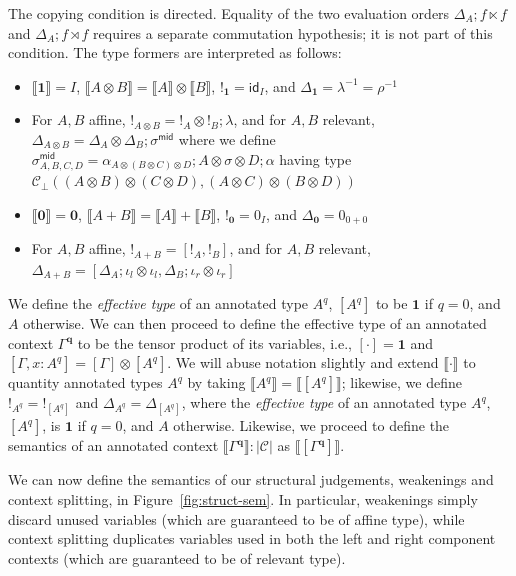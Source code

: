 \documentclass[acmsmall,screen,anonymous,review]{acmart}
\newcommand{\mc}[1]{\ensuremath{\mathcal{#1}}}
\newcommand{\mb}[1]{\ensuremath{\mathbf{#1}}}
\newcommand{\ms}[1]{\ensuremath{\mathsf{#1}}}
\newcommand{\etoty}[1]{[#1]}
\newcommand{\dnt}[1]{\llbracket{#1}\rrbracket}
\newcommand{\tmor}[1]{{!}_{#1}}
\newcommand{\dmor}[1]{{\Delta}_{#1}}
\newcommand{\subiterexp}{\texorpdfstring{\(\lambda_{\ms{iter}}\)}{lambda-iter}}
\begin{document}
\begin{definition}[\subiterexp-model]
  The copying condition is directed. Equality of the two evaluation orders
  $\dmor{A} ; f \ltimes f$ and $\dmor{A} ; f \rtimes f$ requires a separate
  commutation hypothesis; it is not part of this condition.
  The type formers are interpreted as follows:
  \begin{itemize}
    \item $\dnt{\mb{1}} = I$, $\dnt{A \otimes B} = \dnt{A} \otimes \dnt{B}$, 
          $\tmor{\mb{1}} = \ms{id}_I$, and $\dmor{\mb{1}} = \lambda^{-1} = \rho^{-1}$
    \item For $A, B$ affine, $\tmor{A \otimes B} = \tmor{A} \otimes \tmor{B} ; \lambda$, and for $A,
    B$ relevant, $\dmor{A \otimes B} = \dmor{A} \otimes \dmor{B} ; \sigma^{\ms{mid}}
    $
    where we define
    $
    \sigma^{\ms{mid}}_{A, B, C, D} = 
      \alpha_{A \otimes (B \otimes C) \otimes D}
      ; A \otimes \sigma \otimes D
      ; \alpha
    $
    having type $\mc{C}_\bot(
        (A \otimes B) \otimes (C \otimes D), 
        (A \otimes C) \otimes (B \otimes D)
      )
    $
    \item $\dnt{\mb{0}} = \mb{0}$, $\dnt{A + B} = \dnt{A} + \dnt{B}$, 
          $\tmor{\mb{0}} = 0_{I}$, and $\dmor{\mb{0}} = 0_{0 + 0}$
    \item For $A, B$ affine, $\tmor{A + B} = [\tmor{A}, \tmor{B}]$, and for $A, B$ relevant,
    $\dmor{A + B} = [\dmor{A} ; \iota_l \otimes \iota_l, \dmor{B} ; \iota_r \otimes \iota_r]
    $
  \end{itemize}
\end{definition}
We define the \emph{effective type} of an annotated type $A^q$, $\etoty{A^q}$ to be $\mb{1}$ if
$q = 0$, and $A$ otherwise. We can then proceed to define the effective type of an annotated context
$\Gamma^{\mb{q}}$ to be the tensor product of its variables, i.e., $\etoty{\cdot} = \mb{1}$ and
$\etoty{\Gamma, x : A^q} = \etoty{\Gamma} \otimes \etoty{A^q}$. We will abuse notation slightly and
extend $\dnt{\cdot}$ to quantity annotated types $A^q$ by taking $\dnt{A^q} = \dnt{\etoty{A^q}}$;
likewise, we define $\tmor{A^q} = \tmor{\etoty{A^q}}$ and $\dmor{A^q} = \dmor{\etoty{A^q}}$,
where the \emph{effective type} of an annotated type $A^q$, $\etoty{A^q}$, is $\mb{1}$ if $q = 0$,
and $A$ otherwise. Likewise, we proceed to define the semantics of an annotated context
$\dnt{\Gamma^{\mb{q}}} : |\mc{C}|$ as $\dnt{\etoty{\Gamma^{\mb{q}}}}$.

We can now define the semantics of our structural judgements, weakenings and context splitting, in
Figure~\ref{fig:struct-sem}. In particular, weakenings simply discard unused variables (which are
guaranteed to be of affine type), while context splitting duplicates variables used in both the left
and right component contexts (which are guaranteed to be of relevant type).
\end{document}
